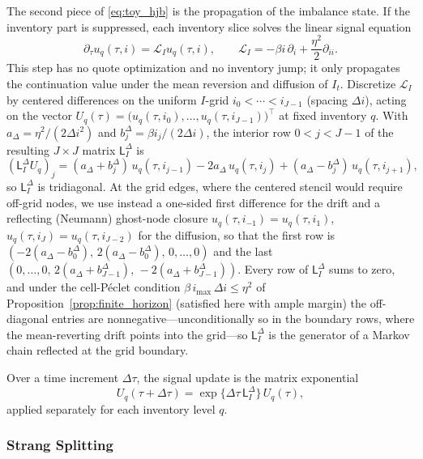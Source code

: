 \documentclass[11pt,a4paper]{article}
\newcommand{\Lcal}{\mathcal{L}}
\theoremstyle{plain}
\theoremstyle{definition}
\begin{document}
The second piece of \eqref{eq:toy_hjb} is the propagation of the imbalance
state.  If the inventory part is suppressed, each inventory slice solves the
linear signal equation
\begin{equation}
\partial_\tau u_q(\tau,i)=\Lcal_Iu_q(\tau,i),
\qquad
\Lcal_I=-\beta i\,\partial_i+\frac{\eta^2}{2}\partial_{ii}.
\label{eq:toy_signal_step}
\end{equation}
This step has no quote optimization and no inventory jump; it only propagates
the continuation value under the mean reversion and diffusion of \(I_t\).
Discretize \(\Lcal_I\) by centered differences on the uniform \(I\)-grid
\(i_0<\cdots<i_{J-1}\) (spacing \(\Delta i\)), acting on the vector
\(U_q(\tau)=\bigl(u_q(\tau,i_0),\ldots,u_q(\tau,i_{J-1})\bigr)^\top\) at fixed
inventory \(q\).  With \(a_\Delta=\eta^2/(2\Delta i^2)\) and
\(b_j^\Delta=\beta i_j/(2\Delta i)\), the interior row \(0<j<J-1\) of the
resulting \(J\times J\) matrix \(\mathsf L_I^\Delta\) is
\[
(\mathsf L_I^\Delta U_q)_j
=(a_\Delta+b_j^\Delta)\,u_q(\tau,i_{j-1})
-2a_\Delta\,u_q(\tau,i_j)
+(a_\Delta-b_j^\Delta)\,u_q(\tau,i_{j+1}),
\]
so \(\mathsf L_I^\Delta\) is tridiagonal.  At the grid edges, where the centered
stencil would require off-grid nodes, we use instead a one-sided first
difference for the drift and a reflecting (Neumann) ghost-node closure
\(u_q(\tau,i_{-1})=u_q(\tau,i_1)\), \(u_q(\tau,i_J)=u_q(\tau,i_{J-2})\) for the
diffusion, so that the first row is
\((-2(a_\Delta-b_0^\Delta),\,2(a_\Delta-b_0^\Delta),\,0,\ldots,0)\) and the last
\((0,\ldots,0,\,2(a_\Delta+b_{J-1}^\Delta),\,-2(a_\Delta+b_{J-1}^\Delta))\).  Every row of
\(\mathsf L_I^\Delta\) sums to zero, and under the cell-P\'eclet condition
\(\beta\,i_{\max}\,\Delta i\le\eta^2\) of
Proposition~\ref{prop:finite_horizon} (satisfied here with ample margin) the
off-diagonal entries are nonnegative---unconditionally so in the boundary
rows, where the mean-reverting drift points into the grid---so
\(\mathsf L_I^\Delta\) is the
generator of a Markov chain reflected at the grid boundary.

Over a time increment \(\Delta\tau\), the signal
update is the matrix exponential
\[
U_q(\tau+\Delta\tau)
=
\exp\{\Delta\tau\,\mathsf L_I^\Delta\}\,U_q(\tau),
\]
applied separately for each inventory level \(q\).


\subsubsection{Strang Splitting}
\label{subsec:strang}
\end{document}
